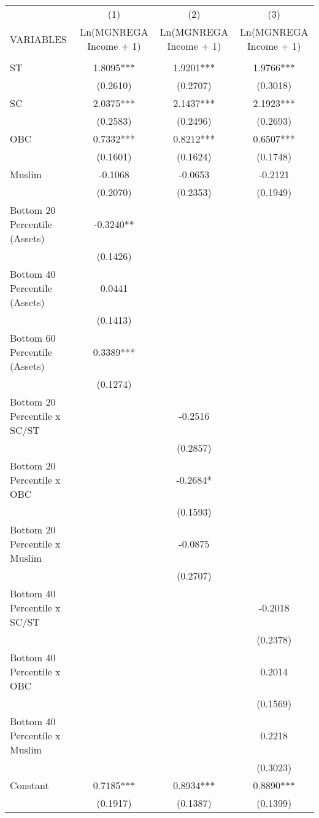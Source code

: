 \documentclass{article}
\begin{document}
\begin{landscape}
\begin{table}[]
\small
    \centering
    \begin{tabular}{lccc} \hline
 & (1) & (2) & (3) \\
VARIABLES & Ln(MGNREGA Income + 1) & Ln(MGNREGA Income + 1) & Ln(MGNREGA Income + 1) \\ \hline
 &  &  &  \\
ST & 1.8095*** & 1.9201*** & 1.9766*** \\
 & (0.2610) & (0.2707) & (0.3018) \\
SC & 2.0375*** & 2.1437*** & 2.1923*** \\
 & (0.2583) & (0.2496) & (0.2693) \\
OBC & 0.7332*** & 0.8212*** & 0.6507*** \\
 & (0.1601) & (0.1624) & (0.1748) \\
Muslim & -0.1068 & -0.0653 & -0.2121 \\
 & (0.2070) & (0.2353) & (0.1949) \\
Bottom 20 Percentile (Assets) & -0.3240** &  &  \\
 & (0.1426) &  &  \\
Bottom 40 Percentile (Assets) & 0.0441 &  &  \\
 & (0.1413) &  &  \\
Bottom 60 Percentile (Assets) & 0.3389*** &  &  \\
 & (0.1274) &  &  \\
Bottom 20 Percentile x SC/ST &  & -0.2516 &  \\
 &  & (0.2857) &  \\
Bottom 20 Percentile x OBC &  & -0.2684* &  \\
 &  & (0.1593) &  \\
Bottom 20 Percentile x Muslim &  & -0.0875 &  \\
 &  & (0.2707) &  \\
Bottom 40 Percentile x SC/ST &  &  & -0.2018 \\
 &  &  & (0.2378) \\
Bottom 40 Percentile x OBC &  &  & 0.2014 \\
 &  &  & (0.1569) \\
Bottom 40 Percentile x Muslim &  &  & 0.2218 \\
 &  &  & (0.3023) \\
Constant & 0.7185*** & 0.8934*** & 0.8890*** \\
 & (0.1917) & (0.1387) & (0.1399) \\

\end{tabular}
\end{table}
\end{landscape}
\end{document}
